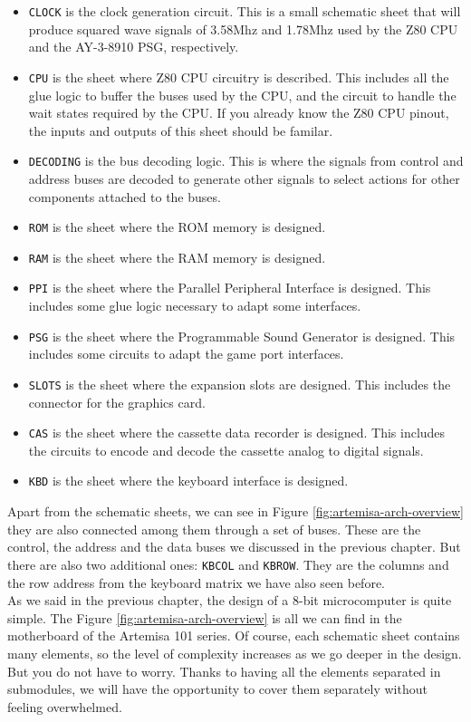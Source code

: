 \begin{itemize}
  \item {\tt CLOCK} is the clock generation circuit. This is a small schematic sheet that will produce squared wave signals of 3.58Mhz and 1.78Mhz used by the Z80 CPU and the AY-3-8910 PSG, respectively.
  \item {\tt CPU} is the sheet where Z80 CPU circuitry is described. This includes all the glue logic to buffer the buses used by the CPU, and the circuit to handle the wait states required by the CPU. If you already know the Z80 CPU pinout, the inputs and outputs of this sheet should be familar.
  \item {\tt DECODING} is the bus decoding logic. This is where the signals from control and address buses are decoded to generate other signals to select actions for other components attached to the buses.
  \item {\tt ROM} is the sheet where the ROM memory is designed.
  \item {\tt RAM} is the sheet where the RAM memory is designed.
  \item {\tt PPI} is the sheet where the Parallel Peripheral Interface is designed. This includes some glue logic necessary to adapt some interfaces.
  \item {\tt PSG} is the sheet where the Programmable Sound Generator is designed. This includes some circuits to adapt the game port interfaces.
  \item {\tt SLOTS} is the sheet where the expansion slots are designed. This includes the connector for the graphics card.
  \item {\tt CAS} is the sheet where the cassette data recorder is designed. This includes the circuits to encode and decode the cassette analog to digital signals.
  \item {\tt KBD} is the sheet where the keyboard interface is designed.
\end{itemize}

Apart from the schematic sheets, we can see in Figure \ref{fig:artemisa-arch-overview} they are also connected among them through a set of buses. These are the control, the address and the data buses we discussed in the previous chapter. But there are also two additional ones: {\tt KBCOL} and {\tt KBROW}. They are the columns and the row address from the keyboard matrix we have also seen before.\\

As we said in the previous chapter, the design of a 8-bit microcomputer is quite simple. The Figure \ref{fig:artemisa-arch-overview} is all we can find in the motherboard of the Artemisa 101 series. Of course, each schematic sheet contains many elements, so the level of complexity increases as we go deeper in the design. But you do not have to worry. Thanks to having all the elements separated in submodules, we will have the opportunity to cover them separately without feeling overwhelmed.

